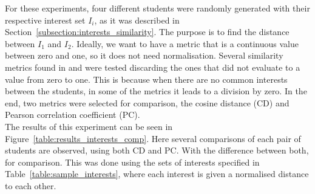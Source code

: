 For these experiments, four different students were randomly generated with their respective interest set $I_i$, as it was described in Section~\ref{subsection:interests_similarity}. The purpose is to find the distance between $I_1$ and $I_2$. Ideally, we want to have a metric that is a continuous value between zero and one, so it does not need normalisation. Several similarity metrics found in \cite{SeyedShirkhorshidi2015AData} and \cite{Sung-HyukChaComprehensiveFunctions} were tested discarding the ones that did not evaluate to a value from zero to one. This is because when there are no common interests between the students, in some of the metrics it leads to a division by zero. In the end, two metrics were selected for comparison, the cosine distance (CD) and Pearson correlation coefficient (PC).\\

The results of this experiment can be seen in Figure~\ref{table:results_interests_comp}. Here several comparisons of each pair of students are observed, using both CD and PC. With the difference between both, for comparison. This was done using the sets of interests specified in Table~\ref{table:sample_interests}, %
where each interest is given a normalised distance to each other.\\

